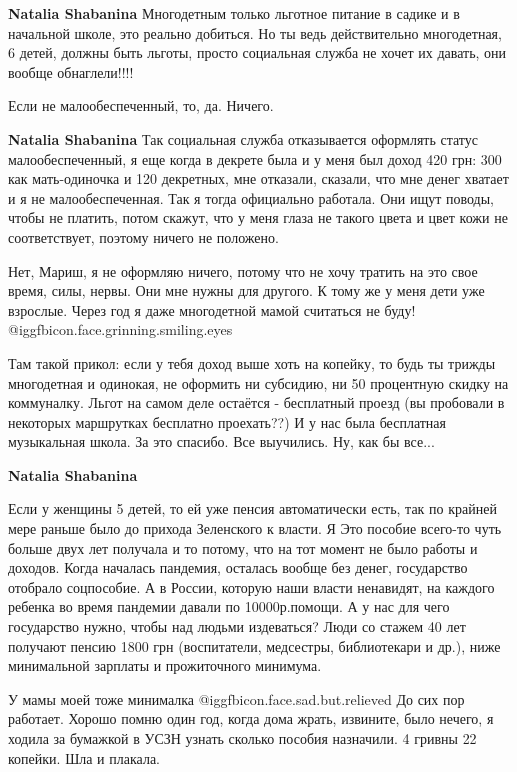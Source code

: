 \begin{itemize}
\begin{itemize}
\textbf{Natalia Shabanina} Многодетным только льготное питание в садике и в начальной школе, это реально добиться. Но ты ведь действительно многодетная, 6 детей, должны быть льготы, просто социальная служба не хочет их давать, они вообще обнаглели!!!!

Если не малообеспеченный, то, да. Ничего.

\textbf{Natalia Shabanina} Так социальная служба отказывается оформлять статус малообеспеченный, я еще когда в декрете была и у меня был доход 420 грн: 300 как мать-одиночка и 120 декретных, мне отказали, сказали, что мне денег хватает и я не малообеспеченная. Так я тогда официально работала. Они ищут поводы, чтобы не платить, потом скажут, что у меня глаза не такого цвета и цвет кожи не соответствует, поэтому ничего не положено.


Нет, Мариш, я не оформляю ничего, потому что не хочу тратить на это свое время,
силы, нервы. Они мне нужны для другого. К тому же у меня дети уже взрослые.
Через год я даже многодетной мамой считаться не буду!  @igg{fbicon.face.grinning.smiling.eyes} 

Там такой прикол: если у тебя доход выше хоть на копейку, то будь ты трижды
многодетная и одинокая, не оформить ни субсидию, ни 50 процентную скидку на
коммуналку. Льгот на самом деле остаётся - бесплатный проезд (вы пробовали в
некоторых маршрутках бесплатно проехать??) И у нас была бесплатная музыкальная
школа. За это спасибо. Все выучились. Ну, как бы все...

\textbf{Natalia Shabanina} 

Если у женщины 5 детей, то ей уже пенсия автоматически есть, так по крайней
мере раньше было до прихода Зеленского к власти. Я Это пособие всего-то чуть
больше двух лет получала и то потому, что на тот момент не было работы и
доходов. Когда началась пандемия, осталась вообще без денег, государство
отобрало соцпособие. А в России, которую наши власти ненавидят, на каждого
ребенка во время пандемии давали по 10000р.помощи. А у нас для чего государство
нужно, чтобы над людьми издеваться? Люди со стажем 40 лет получают пенсию 1800
грн (воспитатели, медсестры, библиотекари и др.), ниже минимальной зарплаты и
прожиточного минимума.


У мамы моей тоже минималка  @igg{fbicon.face.sad.but.relieved}  До сих пор работает. Хорошо помню один год, когда
дома жрать, извините, было нечего, я ходила за бумажкой в УСЗН узнать сколько
пособия назначили. 4 гривны 22 копейки. Шла и плакала.


\end{itemize}
\end{itemize}

